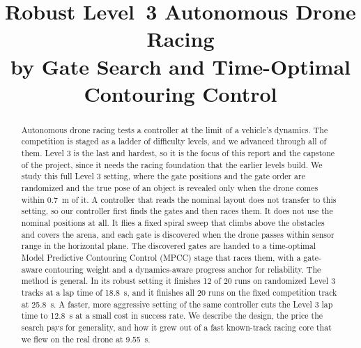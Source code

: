 \documentclass[conference]{IEEEtran}
\begin{document}
\title{Robust Level~3 Autonomous Drone Racing\\ by Gate Search and Time-Optimal Contouring Control}

\author{
\and
{}
}

\maketitle

\begin{abstract}
Autonomous drone racing tests a controller at the limit of a vehicle's dynamics. The competition is staged as a ladder of difficulty levels, and we advanced through all of them. Level 3 is the last and hardest, so it is the focus of this report and the capstone of the project, since it needs the racing foundation that the earlier levels build. We study this full Level 3 setting, where the gate positions and the gate order are randomized and the true pose of an object is revealed only when the drone comes within 0.7~m of it. A controller that reads the nominal layout does not transfer to this setting, so our controller first finds the gates and then races them. It does not use the nominal positions at all. It flies a fixed spiral sweep that climbs above the obstacles and covers the arena, and each gate is discovered when the drone passes within sensor range in the horizontal plane. The discovered gates are handed to a time-optimal Model Predictive Contouring Control (MPCC) stage that races them, with a gate-aware contouring weight and a dynamics-aware progress anchor for reliability. The method is general. In its robust setting it finishes 12 of 20 runs on randomized Level 3 tracks at a lap time of 18.8~s, and it finishes all 20 runs on the fixed competition track at 25.8~s. A faster, more aggressive setting of the same controller cuts the Level 3 lap time to 12.8~s at a small cost in success rate. We describe the design, the price the search pays for generality, and how it grew out of a fast known-track racing core that we flew on the real drone at 9.55~s.
\end{abstract}
\end{document}
